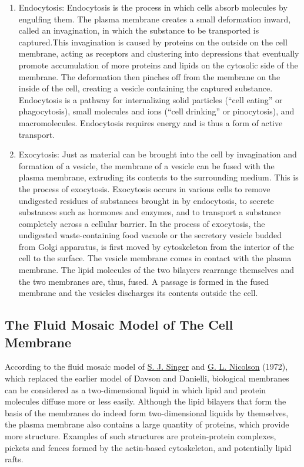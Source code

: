 \begin{enumerate}
\item
  Endocytosis: Endocytosis is the process in which cells absorb molecules by engulfing them. The plasma membrane creates a small deformation inward, called an invagination, in which the substance to be transported is captured.This invagination is caused by proteins on the outside on the cell membrane, acting as receptors and clustering into depressions that eventually promote accumulation of more proteins and lipids on the cytosolic side of the membrane. The deformation then pinches off from the membrane on the inside of the cell, creating a vesicle containing the captured substance. Endocytosis is a pathway for internalizing solid particles (``cell eating'' or phagocytosis), small molecules and ions (``cell drinking'' or pinocytosis), and macromolecules. Endocytosis requires energy and is thus a form of active transport.
\item
  Exocytosis: Just as material can be brought into the cell by invagination and formation of a vesicle, the membrane of a vesicle can be fused with the plasma membrane, extruding its contents to the surrounding medium. This is the process of exocytosis. Exocytosis occurs in various cells to remove undigested residues of substances brought in by endocytosis, to secrete substances such as hormones and enzymes, and to transport a substance completely across a cellular barrier. In the process of exocytosis, the undigested waste-containing food vacuole or the secretory vesicle budded from Golgi apparatus, is first moved by cytoskeleton from the interior of the cell to the surface. The vesicle membrane comes in contact with the plasma membrane. The lipid molecules of the two bilayers rearrange themselves and the two membranes are, thus, fused. A passage is formed in the fused membrane and the vesicles discharges its contents outside the cell.
\end{enumerate}

\hypertarget{the-fluid-mosaic-model-of-the-cell-membrane}{%
\subsection{The Fluid Mosaic Model of The Cell Membrane}\label{the-fluid-mosaic-model-of-the-cell-membrane}}

According to the fluid mosaic model of \href{https://en.wikipedia.org/wiki/Seymour_Jonathan_Singer}{S. J. Singer} and \href{https://en.wikipedia.org/wiki/Garth_L._Nicolson}{G. L. Nicolson} (1972), which replaced the earlier model of Davson and Danielli, biological membranes can be considered as a two-dimensional liquid in which lipid and protein molecules diffuse more or less easily. Although the lipid bilayers that form the basis of the membranes do indeed form two-dimensional liquids by themselves, the plasma membrane also contains a large quantity of proteins, which provide more structure. Examples of such structures are protein-protein complexes, pickets and fences formed by the actin-based cytoskeleton, and potentially lipid rafts.

